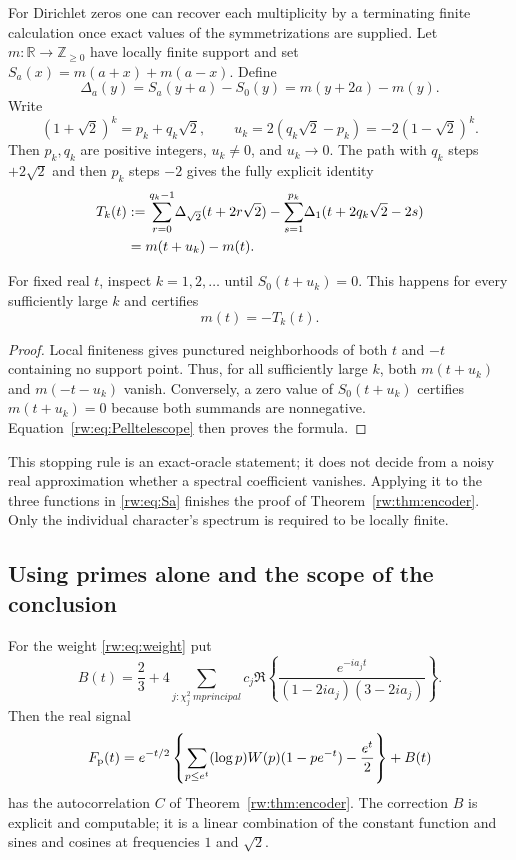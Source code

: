 For Dirichlet zeros one can recover each multiplicity by a terminating
finite calculation once exact values of the symmetrizations are supplied.
Let $m:\mathbb R\to\mathbb Z_{\ge0}$ have locally finite support and set
$S_a(x)=m(a+x)+m(a-x)$. Define
\begin{equation}\label{rw:eq:Da}
 \Delta_a(y)=S_a(y+a)-S_0(y)=m(y+2a)-m(y).
\end{equation}
Write
\[
 (1+\sqrt2)^k=p_k+q_k\sqrt2,\qquad
 u_k=2(q_k\sqrt2-p_k)=-2(1-\sqrt2)^k.
\]
Then $p_k,q_k$ are positive integers, $u_k\ne0$, and $u_k\to0$.
The path with $q_k$ steps $+2\sqrt2$ and then $p_k$ steps $-2$ gives
the fully explicit identity
\begin{align}
 T_k(t)
 &:={\sum_{r=0}^{q_k-1}}\Delta_{\sqrt2}(t+2r\sqrt2)
 -{\sum_{s=1}^{p_k}}\Delta_1(t+2q_k\sqrt2-2s)\notag\\
 &=m(t+u_k)-m(t).\label{rw:eq:Pelltelescope}
\end{align}

\begin{proposition}\label{rw:prop:stop}
For fixed real $t$, inspect $k=1,2,\ldots$ until
$S_0(t+u_k)=0$. This happens for every sufficiently large $k$ and certifies
\[
 m(t)=-T_k(t).
\]
\end{proposition}

\begin{proof}
Local finiteness gives punctured neighborhoods of both $t$ and $-t$
containing no support point. Thus, for all sufficiently large $k$,
both $m(t+u_k)$ and $m(-t-u_k)$ vanish. Conversely, a zero value of
$S_0(t+u_k)$ certifies $m(t+u_k)=0$ because both summands are
nonnegative. Equation~\eqref{rw:eq:Pelltelescope} then proves the formula.
\end{proof}

This stopping rule is an exact-oracle statement; it does not decide from
a noisy real approximation whether a spectral coefficient vanishes.
Applying it to the three functions in \eqref{rw:eq:Sa} finishes the proof
of Theorem~\ref{rw:thm:encoder}. Only the individual character's spectrum
is required to be locally finite.

\subsection{Using primes alone and the scope of the conclusion}

\begin{corollary}\label{rw:cor:primes}
For the weight \eqref{rw:eq:weight} put
\begin{equation}\label{rw:eq:bias}
 B(t)=\frac23+4\sum_{j:\chi_j^2\ {
m principal}}
 c_j\Re\left\{
 \frac{e^{-ia_jt}}{(1-2ia_j)(3-2ia_j)}\right\}.
\end{equation}
Then the real signal
\[
 F_{\rm p}(t)=e^{-t/2}\left\{
 \sum_{p\le e^t}(\log p)W(p)(1-pe^{-t})-\frac{e^t}{2}\right\}+B(t)
\]
has the autocorrelation $C$ of Theorem~\ref{rw:thm:encoder}.
The correction $B$ is explicit and computable; it is a linear combination
of the constant function and sines and cosines at frequencies $1$ and
$\sqrt2$.
\end{corollary}

